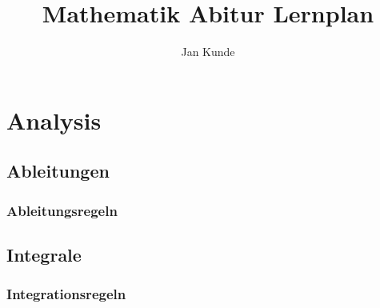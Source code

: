 \documentclass[12pt]{article}
\title{Mathematik Abitur Lernplan}
\author{Jan Kunde}
\begin{document}
\maketitle
\section*{Analysis}

\subsection*{Ableitungen}
    \subsubsection*{Ableitungsregeln}


\subsection*{Integrale}
    \subsubsection*{Integrationsregeln}
\end{document}
